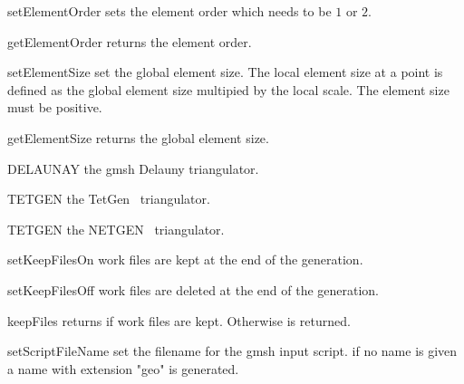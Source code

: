 \begin{methoddesc}[Design]{setElementOrder}{}
sets the element order which needs to be $1$ or $2$.
\end{methoddesc}

\begin{methoddesc}[Design]{getElementOrder}{}
returns the element order.
\end{methoddesc}


\begin{methoddesc}[Design]{setElementSize}{}
set the global element size. The local element size at a point is defined as 
the global element size multipied by the local scale. The element size must be positive.
\end{methoddesc}


\begin{methoddesc}[Design]{getElementSize}{}
returns the global element size.
\end{methoddesc}

\begin{memberdesc}[Design]{DELAUNAY}
the gmsh Delauny triangulator.
\end{memberdesc}

\begin{memberdesc}[Design]{TETGEN}
the TetGen~\cite{TETGEN} triangulator.
\end{memberdesc}

\begin{memberdesc}[Design]{TETGEN}
the NETGEN~\cite{NETGEN} triangulator.
\end{memberdesc}

\begin{methoddesc}[Design]{setKeepFilesOn}{}
work files are kept at the end of the generation.
\end{methoddesc}

\begin{methoddesc}[Design]{setKeepFilesOff}{}
work files are deleted at the end of the generation.
\end{methoddesc}

\begin{methoddesc}[Design]{keepFiles}{}
returns \True if work files are kept. Otherwise \False is returned.
\end{methoddesc}

\begin{methoddesc}[Design]{setScriptFileName}{}
set the filename for the gmsh input script. if no name is given a name with extension "geo" is generated.
\end{methoddesc}

